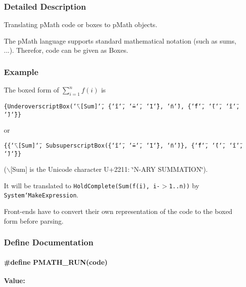 \subsubsection{Detailed Description}
Translating pMath code or boxes to pMath objects. 

The pMath language supports standard mathematical notation (such as sums, ...). Therefor, code can be given as Boxes.\hypertarget{group__parser_Example}{}\subsubsection{Example}\label{group__parser_Example}
The boxed form of $ \sum_{i=1}^n f(i) $ is \par
 {\tt \{UnderoverscriptBox(\char`\"{}$\backslash$\mbox{[}Sum\mbox{]}\char`\"{}, \{\char`\"{}i\char`\"{}, \char`\"{}=\char`\"{}, \char`\"{}1\char`\"{}\}, \char`\"{}n\char`\"{}), \{\char`\"{}f\char`\"{}, \char`\"{}(\char`\"{}, \char`\"{}i\char`\"{}, \char`\"{})\char`\"{}\}\}} \par
 or \par
 {\tt \{\{\char`\"{}$\backslash$\mbox{[}Sum\mbox{]}\char`\"{}, SubsuperscriptBox(\{\char`\"{}i\char`\"{}, \char`\"{}=\char`\"{}, \char`\"{}1\char`\"{}\}, \char`\"{}n\char`\"{})\}, \{\char`\"{}f\char`\"{}, \char`\"{}(\char`\"{}, \char`\"{}i\char`\"{}, \char`\"{})\char`\"{}\}\}} \par
 ($\backslash$\mbox{[}Sum\mbox{]} is the Unicode character U+2211: \char`\"{}N-ARY SUMMATION\char`\"{}).

It will be translated to {\tt HoldComplete(Sum(f(i), i-$>$1..n))} by {\tt System`MakeExpression}.

Front-ends have to convert their own representation of the code to the boxed form before parsing. 

\subsubsection{Define Documentation}
\hypertarget{group__parser_gf8ba5467c4b9e3e32ad0a8606466cb83}{
\paragraph[{PMATH\_\-RUN}]{\setlength{\rightskip}{0pt plus 5cm}\#define PMATH\_\-RUN(code)}\hfill}
\label{group__parser_gf8ba5467c4b9e3e32ad0a8606466cb83}


\textbf{Value:}

